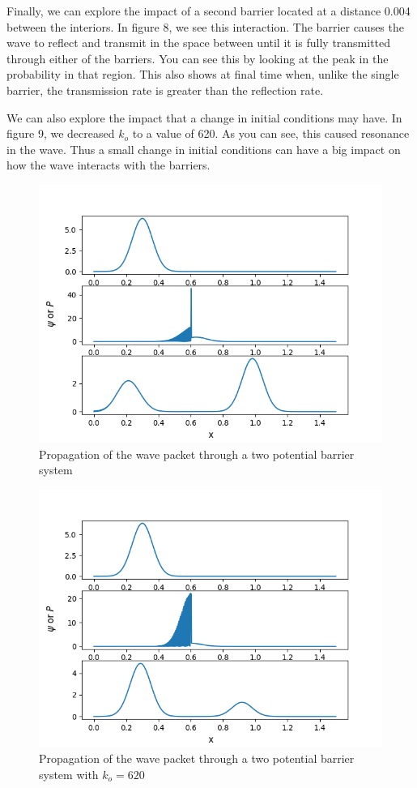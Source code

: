 \documentclass[pra,twocolumn,showpacs,amsmath,amssymb]{revtex4-2}
\begin{document}
\par Finally, we can explore the impact of a second barrier located at a distance 0.004 between the interiors. In figure 8, we see this interaction. The barrier causes the wave to reflect and transmit in the space between until it is fully transmitted through either of the barriers. You can see this by looking at the peak in the probability in that region. This also shows at final time when, unlike the single barrier, the transmission rate is greater than the reflection rate.
\par We can also explore the impact that a change in initial conditions may have. In figure 9, we decreased $k_o$ to a value of 620. As you can see, this caused resonance in the wave. Thus a small change in initial conditions can have a big impact on how the wave interacts with the barriers.

\begin{figure}[t!]
\includegraphics[scale=0.50]{2Barrier.png}
\caption{Propagation of the wave packet through a two potential barrier system}\label{Poincare0.5}
\end{figure}

\begin{figure}[t!]
\includegraphics[scale=0.50]{2Barrier2.png}
\caption{Propagation of the wave packet through a two potential barrier system with $k_o = 620$}\label{Poincare0.5}
\end{figure}
\end{document}
